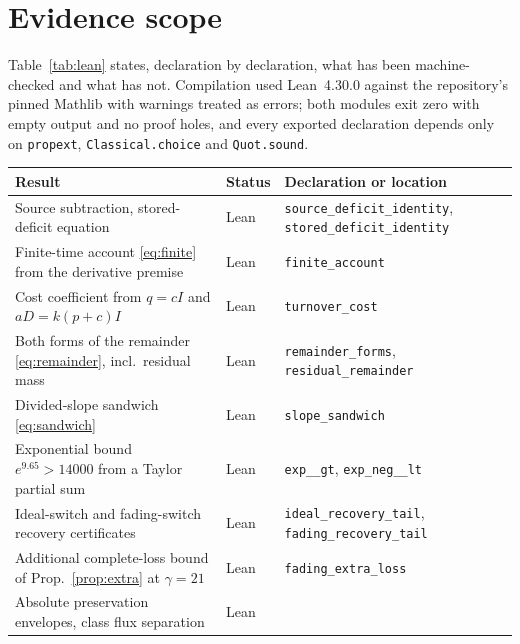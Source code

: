 \documentclass[11pt]{article}
\theoremstyle{definition}
\theoremstyle{remark}
\newcommand{\leanref}[1]{\texttt{\small #1}}
\begin{document}
\section{Evidence scope}
\label{sec:evidence}

Table~\ref{tab:lean} states, declaration by declaration, what has been
machine-checked and what has not. Compilation used Lean~4.30.0 against the
repository's pinned Mathlib with warnings treated as errors; both modules exit
zero with empty output and no proof holes, and every exported declaration
depends only on \leanref{propext}, \leanref{Classical.choice} and
\leanref{Quot.sound}.

\begin{table}[ht]
\centering\small
\begin{tabularx}{\textwidth}{llY}
\toprule
Result & Status & Declaration or location\\
\midrule
Source subtraction, stored-deficit equation & Lean &
\leanref{source\_\allowbreak deficit\_\allowbreak identity}, \leanref{stored\_\allowbreak deficit\_\allowbreak identity}\\
Finite-time account \eqref{eq:finite} from the derivative premise & Lean &
\leanref{finite\_\allowbreak account}\\
Cost coefficient from $q=cI$ and $aD=k(p+c)I$ & Lean &
\leanref{turnover\_\allowbreak cost}\\
Both forms of the remainder \eqref{eq:remainder}, incl.\ residual mass & Lean &
\leanref{remainder\_\allowbreak forms}, \leanref{residual\_\allowbreak remainder}\\
Divided-slope sandwich \eqref{eq:sandwich} & Lean &
\leanref{slope\_\allowbreak sandwich}\\
Exponential bound $e^{9.65}>14000$ from a Taylor partial sum & Lean &
\leanref{exp\_\_\allowbreak gt}, \leanref{exp\_\allowbreak neg\_\allowbreak 965\_\allowbreak lt}\\
Ideal-switch and fading-switch recovery certificates & Lean &
\leanref{ideal\_\allowbreak recovery\_\allowbreak tail}, \leanref{fading\_\allowbreak recovery\_\allowbreak tail}\\
Additional complete-loss bound of Prop.~\ref{prop:extra} at $\gamma=21$ & Lean &
\leanref{fading\_\allowbreak extra\_\allowbreak loss}\\
Absolute preservation envelopes, class flux separation & Lean &

\end{tabularx}
\end{table}
\end{document}
